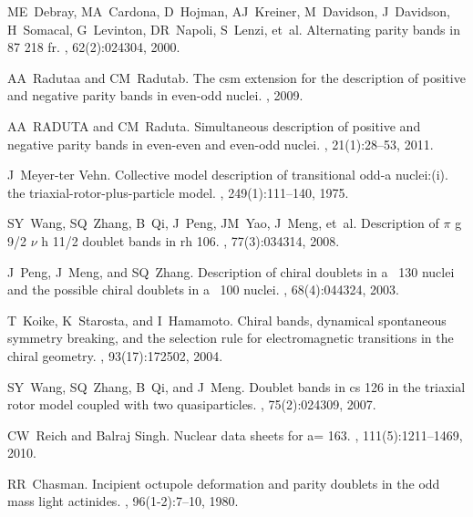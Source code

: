 \documentclass[11pt]{article}
\begin{document}
\begin{thebibliography}{99}
ME~Debray, MA~Cardona, D~Hojman, AJ~Kreiner, M~Davidson, J~Davidson, H~Somacal,
  G~Levinton, DR~Napoli, S~Lenzi, et~al.
\newblock Alternating parity bands in 87 218 fr.
, 62(2):024304, 2000.

AA~Radutaa and CM~Radutab.
\newblock The csm extension for the description of positive and negative parity
  bands in even-odd nuclei.
, 2009.

AA~RADUTA and CM~Raduta.
\newblock Simultaneous description of positive and negative parity bands in
  even-even and even-odd nuclei.
, 21(1):28--53,
  2011.

J~Meyer-ter Vehn.
\newblock Collective model description of transitional odd-a nuclei:(i). the
  triaxial-rotor-plus-particle model.
, 249(1):111--140, 1975.

SY~Wang, SQ~Zhang, B~Qi, J~Peng, JM~Yao, J~Meng, et~al.
\newblock Description of $\pi$ g 9/2 $\nu$ h 11/2 doublet bands in rh 106.
, 77(3):034314, 2008.

J~Peng, J~Meng, and SQ~Zhang.
\newblock Description of chiral doublets in a~ 130 nuclei and the possible
  chiral doublets in a~ 100 nuclei.
, 68(4):044324, 2003.

T~Koike, K~Starosta, and I~Hamamoto.
\newblock Chiral bands, dynamical spontaneous symmetry breaking, and the
  selection rule for electromagnetic transitions in the chiral geometry.
, 93(17):172502, 2004.

SY~Wang, SQ~Zhang, B~Qi, and J~Meng.
\newblock Doublet bands in cs 126 in the triaxial rotor model coupled with two
  quasiparticles.
, 75(2):024309, 2007.

CW~Reich and Balraj Singh.
\newblock Nuclear data sheets for a= 163.
, 111(5):1211--1469, 2010.

RR~Chasman.
\newblock Incipient octupole deformation and parity doublets in the odd mass
  light actinides.
, 96(1-2):7--10, 1980.


\end{thebibliography}
\end{document}
